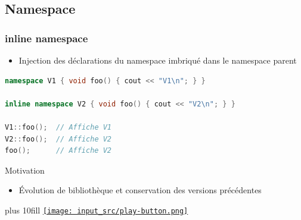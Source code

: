 \documentclass[C++.tex]{subfiles}
\begin{document}
\subsection*{Namespace}
\begin{frame}[fragile]
	\frametitle{inline namespace}
	\begin{itemize}
		\item Injection des déclarations du namespace imbriqué dans le namespace parent
	\end{itemize}

	\begin{lstlisting}[language=C++]
namespace V1 { void foo() { cout << "V1\n"; } }

inline namespace V2 { void foo() { cout << "V2\n"; } }

V1::foo();  // Affiche V1
V2::foo();  // Affiche V2
foo();      // Affiche V2\end{lstlisting}

	\begin{block}{Motivation}
		\begin{itemize}
			\item Évolution de bibliothèque et conservation des versions précédentes
		\end{itemize}
	\end{block}


	\vskip 10mm plus 10fill
	\hfill
	\href{https://godbolt.org/#g:!((g:!((g:!((h:codeEditor,i:(filename:'1',fontScale:14,fontUsePx:'0',j:1,lang:c%2B%2B,selection:(endColumn:1,endLineNumber:26,positionColumn:1,positionLineNumber:26,selectionStartColumn:1,selectionStartLineNumber:26,startColumn:1,startLineNumber:26),source:'%23include+%3Ciostream%3E%0A%0Anamespace+V1%0A%7B%0A++static+void+foo()%0A++%7B%0A++++std::cout+%3C%3C+%22V1%5Cn%22%3B%0A++%7D%0A%7D%0A%0Ainline+namespace+V2%0A%7B%0A++static+void+foo()%0A++%7B%0A++++std::cout+%3C%3C+%22V2%5Cn%22%3B%0A++%7D%0A%7D%0A%0Aint+main()%0A%7B%0A++V1::foo()%3B%0A++V2::foo()%3B%0A%0A++foo()%3B%0A%7D%0A'),l:'5',n:'0',o:'C%2B%2B+source+%231',t:'0')),k:50,l:'4',n:'0',o:'',s:0,t:'0'),(g:!((h:executor,i:(argsPanelShown:'1',compilationPanelShown:'0',compiler:g112,compilerOutShown:'0',execArgs:'',execStdin:'',fontScale:14,fontUsePx:'0',j:1,lang:c%2B%2B,libs:!((name:boost,ver:'175')),options:'-std%3Dc%2B%2B11',source:1,stdinPanelShown:'1',tree:'1',wrap:'0'),l:'5',n:'0',o:'Executor+x86-64+gcc+11.2+(C%2B%2B,+Editor+%231)',t:'0')),header:(),k:50,l:'4',n:'0',o:'',s:0,t:'0')),l:'2',n:'0',o:'',t:'0')),version:4}{\texttt{[image: input\_src/play-button.png]}}
\end{frame}
\end{document}
